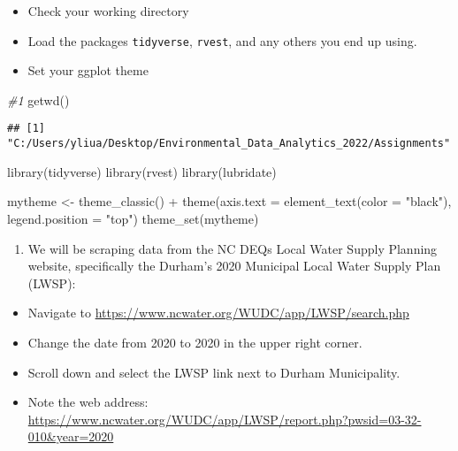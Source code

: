 \documentclass[
]{article}
\newenvironment{Shaded}{\begin{snugshade}}{\end{snugshade}}
\newcommand{\AttributeTok}[1]{\textcolor[rgb]{0.77,0.63,0.00}{#1}}
\newcommand{\CommentTok}[1]{\textcolor[rgb]{0.56,0.35,0.01}{\textit{#1}}}
\newcommand{\FunctionTok}[1]{\textcolor[rgb]{0.00,0.00,0.00}{#1}}
\newcommand{\NormalTok}[1]{#1}
\newcommand{\OtherTok}[1]{\textcolor[rgb]{0.56,0.35,0.01}{#1}}
\newcommand{\SpecialCharTok}[1]{\textcolor[rgb]{0.00,0.00,0.00}{#1}}
\newcommand{\StringTok}[1]{\textcolor[rgb]{0.31,0.60,0.02}{#1}}
\providecommand{\tightlist}{%
  \setlength{\itemsep}{0pt}\setlength{\parskip}{0pt}}
\begin{document}
\begin{itemize}
\tightlist
\item
  Check your working directory
\item
  Load the packages \texttt{tidyverse}, \texttt{rvest}, and any others
  you end up using.
\item
  Set your ggplot theme
\end{itemize}

\begin{Shaded}
\begin{Highlighting}[]
\CommentTok{\#1}
\FunctionTok{getwd}\NormalTok{()}
\end{Highlighting}
\end{Shaded}

\begin{verbatim}
## [1] "C:/Users/yliua/Desktop/Environmental_Data_Analytics_2022/Assignments"
\end{verbatim}

\begin{Shaded}
\begin{Highlighting}[]
\FunctionTok{library}\NormalTok{(tidyverse)}
\FunctionTok{library}\NormalTok{(rvest)}
\FunctionTok{library}\NormalTok{(lubridate)}

\NormalTok{mytheme }\OtherTok{\textless{}{-}} \FunctionTok{theme\_classic}\NormalTok{() }\SpecialCharTok{+}
  \FunctionTok{theme}\NormalTok{(}\AttributeTok{axis.text =} \FunctionTok{element\_text}\NormalTok{(}\AttributeTok{color =} \StringTok{"black"}\NormalTok{), }
        \AttributeTok{legend.position =} \StringTok{"top"}\NormalTok{)}
\FunctionTok{theme\_set}\NormalTok{(mytheme)}
\end{Highlighting}
\end{Shaded}

\begin{enumerate}
\def\labelenumi{\arabic{enumi}.}
\setcounter{enumi}{1}
\tightlist
\item
  We will be scraping data from the NC DEQs Local Water Supply Planning
  website, specifically the Durham's 2020 Municipal Local Water Supply
  Plan (LWSP):
\end{enumerate}

\begin{itemize}
\tightlist
\item
  Navigate to \url{https://www.ncwater.org/WUDC/app/LWSP/search.php}
\item
  Change the date from 2020 to 2020 in the upper right corner.
\item
  Scroll down and select the LWSP link next to Durham Municipality.
\item
  Note the web address:
  \url{https://www.ncwater.org/WUDC/app/LWSP/report.php?pwsid=03-32-010\&year=2020}
\end{itemize}
\end{document}
